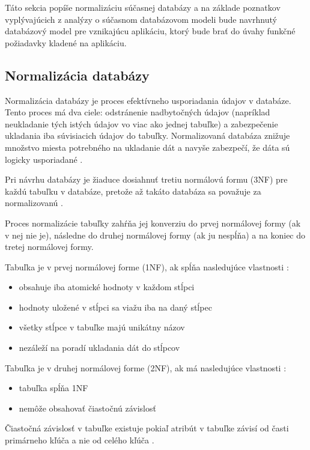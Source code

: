 Táto sekcia popíše normalizáciu súčasnej databázy a na základe poznatkov vyplývajúcich z analýzy o súčasnom databázovom modeli bude navrhnutý databázový model pre vznikajúcu aplikáciu, ktorý bude brať do úvahy funkčné požiadavky kladené na aplikáciu.

\subsection{Normalizácia databázy}
Normalizácia databázy je proces efektívneho usporiadania údajov v databáze. Tento proces má dva ciele: odstránenie nadbytočných údajov (napríklad neukladanie tých istých údajov vo viac ako jednej tabuľke) a zabezpečenie ukladania iba  súvisiacich údajov do tabuľky. Normalizovaná databáza znižuje množstvo miesta potrebného na ukladanie dát a navyše zabezpečí, že dáta sú logicky usporiadané \cite{co-je-normalizacia}.

Pri návrhu databázy je žiaduce dosiahnuť tretiu normálovú formu (3NF) pre každú tabuľku v databáze, pretože až takáto databáza sa považuje za normalizovanú \cite{normalizovana-tabulka}.

Proces normalizácie tabuľky zahŕňa jej konverziu do prvej normálovej formy (ak v nej nie je), následne do druhej normálovej formy (ak ju nespĺňa) a na koniec do tretej normálovej formy.

Tabuľka je v prvej normálovej forme (1NF), ak spĺňa nasledujúce vlastnosti \cite{typy-normalizacie}:
\begin{itemize}
	\item obsahuje iba atomické hodnoty v každom stĺpci
	\item hodnoty uložené v stĺpci sa viažu iba na daný stĺpec
	\item všetky stĺpce v tabuľke majú unikátny názov
	\item nezáleží na poradí ukladania dát do stĺpcov 
\end{itemize}

Tabuľka je v druhej normálovej forme (2NF), ak má nasledujúce vlastnosti \cite{typy-normalizacie}:
\begin{itemize}
	\item tabuľka spĺňa 1NF
	\item nemôže obsahovať čiastočnú závislosť
\end{itemize}

Čiastočná závislosť v tabuľke existuje pokiaľ atribút v tabuľke závisí od časti primárneho kľúča a nie od celého kľúča \cite{ciastocna-zavislost}. 


